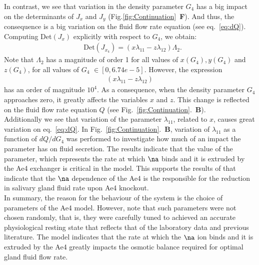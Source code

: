 In contrast, we see that variation in the density parameter $G_4$ has a big impact on the determinants of $J_x$ and $J_y$ (Fig.\ref{fig:Continuation}~\textbf{F}). And thus, the consequence is a big variation on the fluid flow rate equation (see eq.~\ref{eq:dQ}). Computing Det$(J_x)$ explicitly with respect to $G_4$, we obtain:
\begin{align*}
& \text{Det}(J_{x_4})=(x \lambda_{11}- z\lambda_{12}) \Lambda_2.
\end{align*}
Note that $\Lambda_2$ has a magnitude of order 1 for all values of $x(G_4), y(G_4) $ and $z(G_4)$, for all values of $G_4$ $\in [0, 6.74e-5]$. However, the expression
\begin{align*}
(x \lambda_{11}- z\lambda_{12}) 
\end{align*}
has an order of magnitude $10^{4}$. As a consequence, when the density parameter $G_4$ approaches zero, it greatly affects the variables $x$ and $z$. This change is reflected on the fluid flow rate equation $Q$ (see Fig.~\ref{fig:Continuation}.~\textbf{B}).\\ 

Additionally we see that variation of the parameter $\lambda_{11}$, related to $x$, causes great variation on eq.~\eqref{eq:dQ}. In Fig.~\ref{fig:Continuation}.~\textbf{B}, variation of $\lambda_{11}$ as a function of $dQ/d{G_4}$ was performed to investigate how much of an impact the parameter has on fluid secretion. The results indicate that the value of the parameter, which represents the rate at which $\na$ binds and it is extruded by the Ae4 exchanger is critical in the model. This supports the results of \cite{siguenza2017Ae4} that indicate that the $\na$ dependence of the Ae4 is the responsible for the reduction in salivary gland fluid rate upon Ae4 knockout.\\

In summary, the reason for the behaviour of the system is the choice of parameters of the Ae4 model. However, note that such parameters were not chosen randomly, that is, they were carefully tuned to achieved an accurate physiological resting state that reflects that of the laboratory data and previous literature. The model indicates that the rate at which the $\na$ ion binds and it is extruded by the Ae4 greatly impacts the osmotic balance required for optimal gland fluid flow rate.